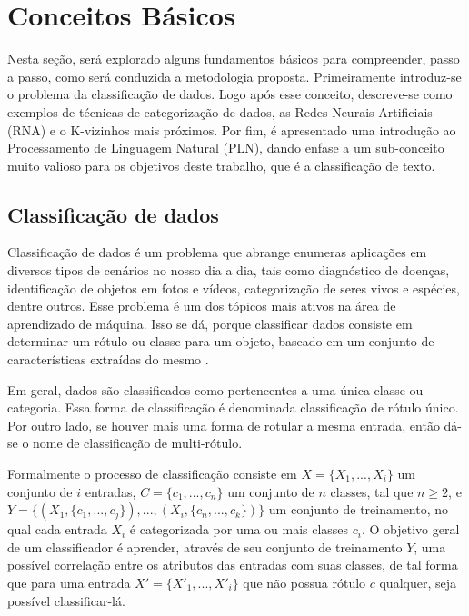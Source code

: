 \chapter{Conceitos Básicos}
Nesta seção, será explorado alguns fundamentos básicos para compreender, passo a passo, como será conduzida a metodologia proposta. Primeiramente introduz-se o problema da classificação de dados. Logo após esse conceito, descreve-se como exemplos de técnicas de categorização de dados, as Redes Neurais Artificiais (RNA) e o K-vizinhos mais próximos. Por fim, é apresentado uma introdução ao Processamento de Linguagem Natural (PLN), dando enfase a um sub-conceito muito valioso para os objetivos deste trabalho, que é a classificação de texto.

\section{Classificação de dados}
Classificação de dados é um problema que abrange enumeras aplicações em diversos tipos de cenários no nosso dia a dia, tais como diagnóstico de doenças, identificação de objetos em fotos e vídeos, categorização de seres vivos e espécies, dentre outros. Esse problema é um dos tópicos mais ativos na área de aprendizado de máquina. Isso se dá, porque classificar dados consiste em determinar um rótulo ou classe para um objeto, baseado em um conjunto de características extraídas do mesmo \citep{duda1973pattern,bishop2006pattern}. 

Em geral, dados são classificados como pertencentes a uma única classe ou categoria. Essa forma de classificação é denominada classificação de rótulo único. Por outro lado, se houver mais uma forma de rotular a mesma entrada, então dá-se o nome de classificação de multi-rótulo. 

Formalmente o processo de classificação consiste em $X = \{X_1,...,X_i\}$ um conjunto de $i$ entradas, $C = \{c_1,...,c_n\}$ um conjunto de $n$ classes, tal que $n \geq 2$, e $Y = \{(X_1, \{c_1,...,c_j\}),...,(X_i, \{c_n,...,c_k\})\}$ um conjunto de treinamento, no qual cada entrada $X_i$ é categorizada por uma ou mais classes $c_i$. O objetivo geral de um classificador é aprender, através de seu conjunto de treinamento $Y$, uma possível correlação entre os atributos das entradas com suas classes, de tal forma que para uma entrada $X' = \{X'_1,...,X'_i\}$ que não possua rótulo $c$ qualquer, seja possível classificar-lá.

